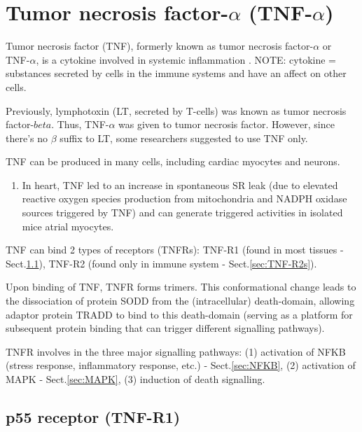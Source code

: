 \section{Tumor necrosis factor-$\alpha$ (TNF-$\alpha$)}
\label{sec:TNF-alpha}

Tumor necrosis factor (TNF), formerly known as tumor necrosis factor-$\alpha$ or
TNF-$\alpha$, is a cytokine involved in systemic inflammation
\citep{mirkhani2012}.  NOTE: cytokine = substances secreted by cells in the
immune systems and have an affect on other cells.

Previously, lymphotoxin (LT, secreted by T-cells) was known as tumor necrosis
factor-$beta$. Thus, TNF-$\alpha$ was given to tumor necrosis factor.
However, since there's no $\beta$ suffix to LT, some researchers suggested to
use TNF only. 

TNF can be produced in many cells, including cardiac myocytes and neurons.
\begin{enumerate}
  
  \item  In heart, TNF led to an increase in spontaneous SR leak (due to
  elevated reactive oxygen species production from mitochondria and NADPH
  oxidase sources triggered by TNF) and can generate triggered activities in
  isolated mice atrial myocytes.

\end{enumerate}


\begin{framed}

TNF can bind 2 types of receptors (TNFRs): TNF-R1 (found in most tissues -
Sect.\ref{sec:TNF-R1}), TNF-R2 (found only in immune system - Sect.\ref{sec:TNF-R2s}). 

Upon binding of TNF, TNFR forms trimers. This conformational change leads to the
dissociation of protein SODD from the (intracellular) death-domain, allowing
adaptor protein TRADD to bind to this death-domain (serving as a platform for
subsequent protein binding that can trigger different signalling pathways). 

TNFR involves in the three major signalling pathways: (1) activation of NFKB
(stress response, inflammatory response, etc.) - Sect.\ref{sec:NFKB}, (2)
activation of MAPK - Sect.\ref{sec:MAPK}, (3) induction of death signalling.

\end{framed}

\subsection{p55 receptor (TNF-R1)}
\label{sec:TNF-R1}
\label{sec:p55-receptor}

